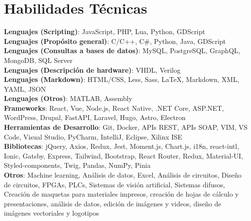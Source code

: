 \documentclass[letterpaper,11pt]{article}
\makeatletter
\newcommand{\resumeItem}[1]{
  \item\small{
    {#1 \vspace{-2pt}}
  }
}
\newcommand{\resumeProjectHeading}[2]{
    \item
    \begin{tabular*}{0.97\textwidth}{l@{\extracolsep{\fill}}r}
      \small#1 & #2 \\
    \end{tabular*}\vspace{-7pt}
}
\newcommand{\resumeSubHeadingListStart}{\begin{itemize}[leftmargin=0.15in, label={}]}
\newcommand{\resumeSubHeadingListEnd}{\end{itemize}}
\newcommand{\resumeItemListStart}{\begin{itemize}[leftmargin=0.15in]}
\newcommand{\resumeItemListEnd}{\end{itemize}\vspace{-5pt}}
\makeatother
\begin{document}

\section{Habilidades Técnicas}
\begin{itemize}[leftmargin=0.05in, label={}, itemsep=2pt, parsep=2pt]
  \small{\item{
    \textbf{Lenguajes (Scripting)}{: JavaScript, PHP, Lua, Python, GDScript} \\
    \textbf{Lenguajes (Propósito general)}{: C/C++, C\#, Python, Java, GDScript} \\
    \textbf{Lenguajes (Consultas a bases de datos)}{: MySQL, PostgreSQL, GraphQL, MongoDB, SQL Server} \\
    \textbf{Lenguajes (Descripción de hardware)}{: VHDL, Verilog} \\
    \textbf{Lenguajes (Markdown)}{: HTML/CSS, Less, Sass, LaTeX, Markdown, XML, YAML, JSON} \\
    \textbf{Lenguajes (Otros)}{: MATLAB, Assembly} \\
    \textbf{Frameworks}{: React, Vue, Node.js, React Native, .NET Core, ASP.NET, WordPress, Drupal, FastAPI, Laravel, Hugo, Astro, Electron} \\
    \textbf{Herramientas de Desarrollo}{: Git, Docker, APIs REST, APIs SOAP, VIM, VS Code, Visual Studio, PyCharm, IntelliJ, Eclipse, Xilinx ISE} \\
    \textbf{Bibliotecas}{: jQuery, Axios, Redux, Jest, Moment.js, Chart.js, i18n, react-intl, Ionic, Gatsby, Express, Tailwind, Bootstrap, React Router, Redux, Material-UI, Styled-components, Twig, Pandas, NumPy, Pinia} \\
    \textbf{Otros}{: Machine learning, Análisis de datos, Excel, Análisis de circuitos, Diseño de circuitos, FPGAs, PLCs, Sistemas de visión artificial, Sistemas difusos, Creación de maquetas para materiales impresos, creación de hojas de cálculo y presentaciones, análisis de datos, edición de imágenes y videos, diseño de imágenes vectoriales y logotipos} \
  }}
\end{itemize}
\end{document}
